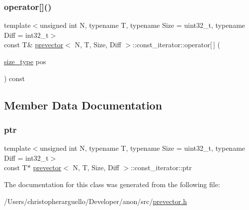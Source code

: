 \subsubsection{\texorpdfstring{operator[]()}{operator[]()}}
{\footnotesize\ttfamily template$<$unsigned int N, typename T, typename Size = uint32\+\_\+t, typename Diff = int32\+\_\+t$>$ \\
const T\& \mbox{\hyperlink{classprevector}{prevector}}$<$ N, T, Size, Diff $>$\+::const\+\_\+iterator\+::operator\mbox{[}$\,$\mbox{]} (\begin{DoxyParamCaption}\item[{\mbox{\hyperlink{classprevector_a7e0da95e6d1c878f6eeb572f4fc12524}{size\+\_\+type}}}]{pos }\end{DoxyParamCaption}) const\hspace{0.3cm}{\ttfamily [inline]}}



\subsection{Member Data Documentation}
\mbox{\label{classprevector_1_1const__iterator_a3946bd001894988f6881f7ea5f108c87}} 
\subsubsection{\texorpdfstring{ptr}{ptr}}
{\footnotesize\ttfamily template$<$unsigned int N, typename T, typename Size = uint32\+\_\+t, typename Diff = int32\+\_\+t$>$ \\
const T$\ast$ \mbox{\hyperlink{classprevector}{prevector}}$<$ N, T, Size, Diff $>$\+::const\+\_\+iterator\+::ptr\hspace{0.3cm}{\ttfamily [private]}}



The documentation for this class was generated from the following file\+:\begin{DoxyCompactItemize}
\item 
/\+Users/christopherarguello/\+Developer/anon/src/\mbox{\hyperlink{prevector_8h}{prevector.\+h}}\end{DoxyCompactItemize}
